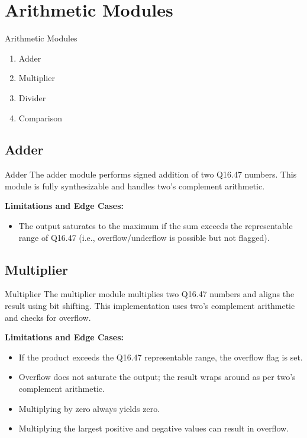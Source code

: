 \documentclass{beamer}
\theoremstyle{remark}
\begin{document}
\section{Arithmetic Modules}
\begin{frame}{Arithmetic Modules}
\begin{enumerate}
    \item Adder
    \item Multiplier
    \item Divider
    \item Comparison
\end{enumerate}
\end{frame}

\subsection{Adder}
\begin{frame}{Adder}
    The adder module performs signed addition of two Q16.47 numbers.
This module is fully synthesizable and handles two's complement arithmetic.

\textbf{Limitations and Edge Cases:}
\begin{itemize}
    \item The output saturates to the maximum if the sum exceeds the representable range of Q16.47 (i.e., overflow/underflow is possible but not flagged).
\end{itemize}
\end{frame}

\subsection{Multiplier}
\begin{frame}{Multiplier}
    The multiplier module multiplies two Q16.47 numbers and aligns the result using bit shifting.
This implementation uses two's complement arithmetic and checks for overflow.

\textbf{Limitations and Edge Cases:}
\begin{itemize}
    \item If the product exceeds the Q16.47 representable range, the overflow flag is set.
    \item Overflow does not saturate the output; the result wraps around as per two's complement arithmetic.
    \item Multiplying by zero always yields zero.
    \item Multiplying the largest positive and negative values can result in overflow.
    \end{itemize}
\end{frame}
\end{document}
